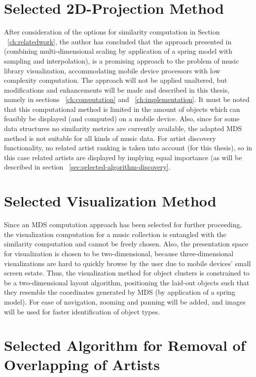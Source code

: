 \section{Selected 2D-Projection Method}

After consideration of the options for similarity computation in Section ~\ref{ch:relatedwork}, the author has concluded that the approach presented in \cite{Morrison:2003:FMS} (combining multi-dimensional scaling by application of a spring model with sampling and interpolation), is a promising approach to the problem of music library visualization, accommodating mobile device processors with low complexity computation. The approach will not be applied unaltered, but modifications and enhancements will be made and described in this thesis, namely in sections ~\ref{ch:computation} and ~\ref{ch:implementation}.
It must be noted that this computational method is limited in the amount of objects which can feasibly be displayed (and computed) on a mobile device. Also, since for some data structures no similarity metrics are currently available, the adapted MDS method is not suitable for all kinds of music data. For artist discovery functionality, no related artist ranking is taken into account (for this thesis), so in this case related artists are displayed by implying equal importance (as will be described in section ~\ref{sec:selected-algorithm-discovery}.

\section{Selected Visualization Method}

Since an MDS computation approach has been selected for further proceeding, the visualization computation for a music collection is entangled with the similarity computation and cannot be freely chosen. Also, the presentation space for visualization is chosen to be two-dimensional, because three-dimensional visualizations are hard to quickly browse by the user due to mobile devices' small screen estate. Thus, the visualization method for object clusters is constrained to be a two-dimensional layout algorithm, positioning the laid-out objects such that they resemble the coordinates generated by MDS (by application of a spring model). For ease of navigation, zooming and panning will be added, and images will be used for faster identification of object types.

\section{Selected Algorithm for Removal of Overlapping of Artists}

